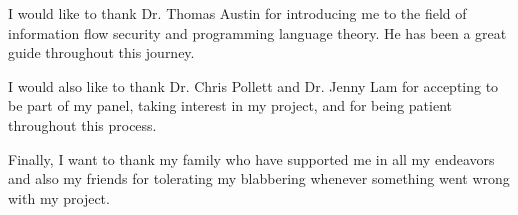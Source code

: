 I would like to thank Dr. Thomas Austin for introducing me to the field of information
flow security and programming language theory. He has been a great guide throughout
this journey.

I would also like to thank Dr. Chris Pollett and Dr. Jenny Lam for accepting to
be part of my panel, taking interest in my project, and for being patient throughout
this process.

Finally, I want to thank my family who have supported me in all my endeavors and
also my friends for tolerating my blabbering whenever something went wrong with
my project.
